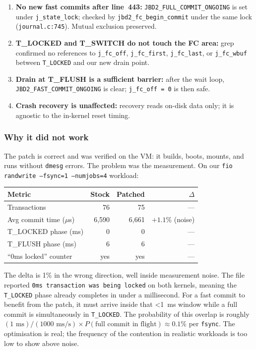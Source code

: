 \documentclass[12pt,a4paper]{article}
\newcommand{\pth}[1]{\path{#1}}
\begin{document}
\begin{enumerate}[leftmargin=*]
  \item \textbf{No new fast commits after line~443:}
        \texttt{JBD2\_FULL\_COMMIT\_ONGOING} is set under
        \texttt{j\_state\_lock}; checked by
        \texttt{jbd2\_fc\_begin\_commit} under the same lock
        (\texttt{journal.c:745}).  Mutual exclusion preserved.
  \item \textbf{T\_LOCKED and T\_SWITCH do not touch the FC area:}
        grep confirmed no references to \texttt{j\_fc\_off},
        \texttt{j\_fc\_first}, \texttt{j\_fc\_last}, or
        \texttt{j\_fc\_wbuf} between \texttt{T\_LOCKED} and our new
        drain point.
  \item \textbf{Drain at T\_FLUSH is a sufficient barrier:} after
        the wait loop, \texttt{JBD2\_FAST\_COMMIT\_ONGOING} is clear;
        \texttt{j\_fc\_off = 0} is then safe.
  \item \textbf{Crash recovery is unaffected:} recovery reads
        on-disk data only; it is agnostic to the in-kernel reset
        timing.
\end{enumerate}

\subsubsection{Why it did not work}

The patch is correct and was verified on the VM: it builds, boots,
mounts, and runs without \texttt{dmesg} errors.  The problem was
the measurement.  On our \texttt{fio} \texttt{randwrite --fsync=1
--numjobs=4} workload:

\begin{center}
\begin{tabular}{lrrr}
\toprule
Metric & Stock & Patched & $\Delta$ \\
\midrule
Transactions            & 76   & 75   & --- \\
Avg commit time ($\mu$s) & 6{,}590 & 6{,}661 & $+1.1\%$ (noise) \\
T\_LOCKED phase (ms)   & 0    & 0    & --- \\
T\_FLUSH phase (ms)    & 6    & 6    & --- \\
``0ms locked'' counter  & yes  & yes  & --- \\
\bottomrule
\end{tabular}
\end{center}

The delta is 1\% in the wrong direction, well inside measurement
noise.  The \pth{/proc/fs/jbd2/loopX-8/info} file reported
\texttt{0ms transaction was being locked} on both kernels, meaning
the \texttt{T\_LOCKED} phase already completes in under a
millisecond.  For a fast commit to benefit from the patch, it must
arrive inside that \textless 1~ms window while a full commit is
simultaneously in \texttt{T\_LOCKED}.  The probability of this
overlap is roughly $(1\text{ ms}) / (1000\text{ ms/s}) \times
P(\text{full commit in flight}) \approx 0.1\%$ per \texttt{fsync}.
The optimisation is real; the frequency of the contention in
realistic workloads is too low to show above noise.
\end{document}
